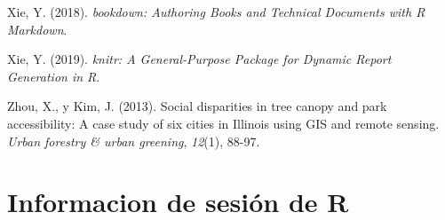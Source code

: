 \documentclass[12pt,a4paper,openany]{book}
\theoremstyle{definition}
\theoremstyle{definition}
\theoremstyle{definition}
\theoremstyle{remark}
\begin{document}
\hypertarget{ref-R-bookdown}{}
Xie, Y. (2018). \emph{bookdown: Authoring Books and Technical Documents
with R Markdown}.

\hypertarget{ref-R-knitr}{}
Xie, Y. (2019). \emph{knitr: A General-Purpose Package for Dynamic
Report Generation in R}.

\hypertarget{ref-zhou_social_2013}{}
Zhou, X., y Kim, J. (2013). Social disparities in tree canopy and park
accessibility: A case study of six cities in Illinois using GIS and
remote sensing. \emph{Urban forestry \& urban greening}, \emph{12}(1),
88-97.

\appendix


\chapter{Informacion de sesión de R}\label{rinfo}
\end{document}
